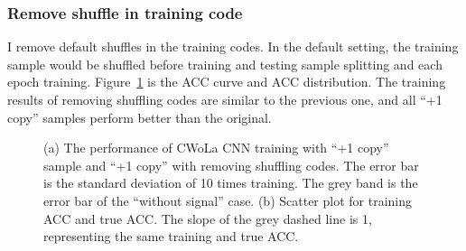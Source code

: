 \documentclass[12pt]{article}
\begin{document}
		\subsubsection{Remove shuffle in training code}%
		\label{subs:remove_shuffle_in_training_code}
			I remove default shuffles in the training codes. In the default setting, the training sample would be shuffled before training and testing sample splitting and each epoch training. Figure~\ref{fig:cwola_cnn_training_performance_copy_1_wo_shuffle_code} is the ACC curve and ACC distribution. The training results of removing shuffling codes are similar to the previous one, and all ``+1 copy'' samples perform better than the original.
			\begin{figure}[htpb]
				\centering
				\caption{(a) The performance of CWoLa CNN training with ``+1 copy'' sample and ``+1 copy'' with removing shuffling codes. The error bar is the standard deviation of 10 times training. The grey band is the error bar of the ``without signal'' case. (b) Scatter plot for training ACC and true ACC. The slope of the grey dashed line is 1, representing the same training and true ACC.}
				\label{fig:cwola_cnn_training_performance_copy_1_wo_shuffle_code}
			\end{figure}
\end{document}
